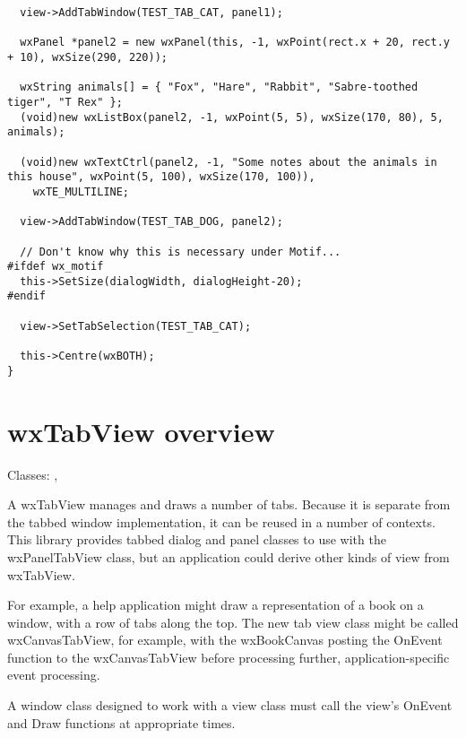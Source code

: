 {\begin{verbatim}
  view->AddTabWindow(TEST_TAB_CAT, panel1);

  wxPanel *panel2 = new wxPanel(this, -1, wxPoint(rect.x + 20, rect.y + 10), wxSize(290, 220));

  wxString animals[] = { "Fox", "Hare", "Rabbit", "Sabre-toothed tiger", "T Rex" };
  (void)new wxListBox(panel2, -1, wxPoint(5, 5), wxSize(170, 80), 5, animals);

  (void)new wxTextCtrl(panel2, -1, "Some notes about the animals in this house", wxPoint(5, 100), wxSize(170, 100)),
    wxTE_MULTILINE;
  
  view->AddTabWindow(TEST_TAB_DOG, panel2);
  
  // Don't know why this is necessary under Motif...
#ifdef wx_motif
  this->SetSize(dialogWidth, dialogHeight-20);
#endif

  view->SetTabSelection(TEST_TAB_CAT);
  
  this->Centre(wxBOTH);
}
\end{verbatim}
}

\section{wxTabView overview}\label{wxtabviewoverview}

Classes: , 

A wxTabView manages and draws a number of tabs. Because it is separate
from the tabbed window implementation, it can be reused in a number of contexts.
This library provides tabbed dialog and panel classes to use with the
wxPanelTabView class, but an application could derive other kinds of
view from wxTabView. 

For example, a help application might draw a representation of a book on
a window, with a row of tabs along the top. The new tab view class might
be called wxCanvasTabView, for example, with the wxBookCanvas posting
the OnEvent function to the wxCanvasTabView before processing further,
application-specific event processing. 

A window class designed to work with a view class must call the view's
OnEvent and Draw functions at appropriate times.

